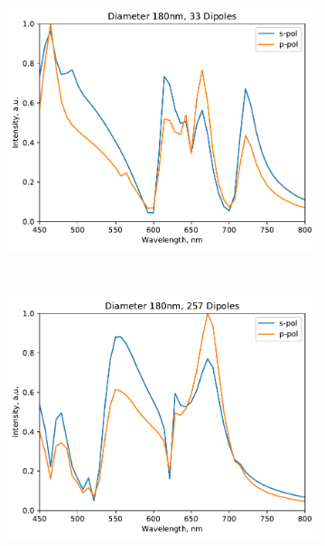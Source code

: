             \begin{figure}[h!]
                \centering
                \begin{subfigure}[b]{0.3\textwidth}
                    \includegraphics[width=\textwidth]{figs/methods/DDA/n_33.pdf}
                    \caption{}
                \end{subfigure}~
                \begin{subfigure}[b]{0.3\textwidth}
                    \includegraphics[width=\textwidth]{figs/methods/DDA/n_257.pdf}
                    \caption{}
                \end{subfigure}~
                \begin{subfigure}[b]{0.3\textwidth}

\end{subfigure}
\end{figure}
